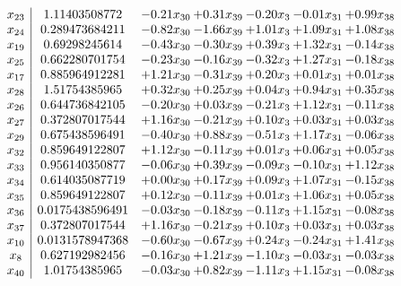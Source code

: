 \documentclass[8pt]{article}
\begin{document}
\[\begin{array}{c| c c@{\hskip 2pt} c@{\hskip 2pt} c@{\hskip 2pt} c@{\hskip 2pt} c@{\hskip 2pt} }
 x_{23}   &  1.11403508772 & -0.21 x_{30} & +  0.31 x_{39} & -0.20 x_{3} & -0.01 x_{31} & +  0.99 x_{38}\\
 x_{24}   &  0.289473684211 & -0.82 x_{30} & -1.66 x_{39} & +  1.01 x_{3} & +  1.09 x_{31} & +  1.08 x_{38}\\
 x_{19}   &  0.69298245614 & -0.43 x_{30} & -0.30 x_{39} & +  0.39 x_{3} & +  1.32 x_{31} & -0.14 x_{38}\\
 x_{25}   &  0.662280701754 & -0.23 x_{30} & -0.16 x_{39} & -0.32 x_{3} & +  1.27 x_{31} & -0.18 x_{38}\\
 x_{17}   &  0.885964912281 & +  1.21 x_{30} & -0.31 x_{39} & +  0.20 x_{3} & +  0.01 x_{31} & +  0.01 x_{38}\\
 x_{28}   &  1.51754385965 & +  0.32 x_{30} & +  0.25 x_{39} & +  0.04 x_{3} & +  0.94 x_{31} & +  0.35 x_{38}\\
 x_{26}   &  0.644736842105 & -0.20 x_{30} & +  0.03 x_{39} & -0.21 x_{3} & +  1.12 x_{31} & -0.11 x_{38}\\
 x_{27}   &  0.372807017544 & +  1.16 x_{30} & -0.21 x_{39} & +  0.10 x_{3} & +  0.03 x_{31} & +  0.03 x_{38}\\
 x_{29}   &  0.675438596491 & -0.40 x_{30} & +  0.88 x_{39} & -0.51 x_{3} & +  1.17 x_{31} & -0.06 x_{38}\\
 x_{32}   &  0.859649122807 & +  1.12 x_{30} & -0.11 x_{39} & +  0.01 x_{3} & +  0.06 x_{31} & +  0.05 x_{38}\\
 x_{33}   &  0.956140350877 & -0.06 x_{30} & +  0.39 x_{39} & -0.09 x_{3} & -0.10 x_{31} & +  1.12 x_{38}\\
 x_{34}   &  0.614035087719 & +  0.00 x_{30} & +  0.17 x_{39} & +  0.09 x_{3} & +  1.07 x_{31} & -0.15 x_{38}\\
 x_{35}   &  0.859649122807 & +  0.12 x_{30} & -0.11 x_{39} & +  0.01 x_{3} & +  1.06 x_{31} & +  0.05 x_{38}\\
 x_{36}   &  0.0175438596491 & -0.03 x_{30} & -0.18 x_{39} & -0.11 x_{3} & +  1.15 x_{31} & -0.08 x_{38}\\
 x_{37}   &  0.372807017544 & +  1.16 x_{30} & -0.21 x_{39} & +  0.10 x_{3} & +  0.03 x_{31} & +  0.03 x_{38}\\
 x_{10}   &  0.0131578947368 & -0.60 x_{30} & -0.67 x_{39} & +  0.24 x_{3} & -0.24 x_{31} & +  1.41 x_{38}\\
 x_{8}   &  0.627192982456 & -0.16 x_{30} & +  1.21 x_{39} & -1.10 x_{3} & -0.03 x_{31} & -0.03 x_{38}\\
 x_{40}   &  1.01754385965 & -0.03 x_{30} & +  0.82 x_{39} & -1.11 x_{3} & +  1.15 x_{31} & -0.08 x_{38}\\

\end{array}\]
\end{document}
